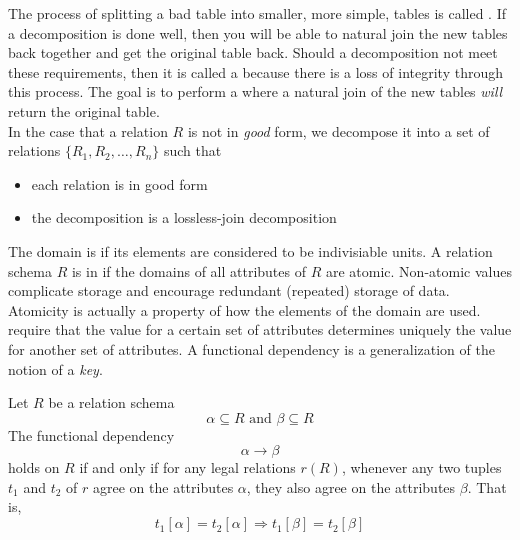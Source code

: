 \documentclass{article}
\begin{document}
The process of splitting a bad table into smaller, more simple, tables is called . If a decomposition is done well, then you will be able to natural join the new tables back together and get the original table back. Should a decomposition not meet these requirements, then it is called a  because there is a loss of integrity through this process. The goal is to perform a  where a natural join of the new tables \emph{will} return the original table. \\

In the case that a relation $R$ is not in \emph{good} form, we decompose it into a set of relations $\{R_1 , R_2 , \dots , R_n\}$ such that 
\begin{itemize}
  \item each relation is in good form 
  \item the decomposition is a lossless-join decomposition
\end{itemize}

The domain is  if its elements are considered to be indivisiable units. A relation schema $R$ is in  if the domains of all attributes of $R$ are atomic. Non-atomic values complicate storage and encourage redundant (repeated) storage of data. Atomicity is actually a property of how the elements of the domain are used. \\ 

 require that the value for a certain set of attributes determines uniquely the value for another set of attributes. A functional dependency is a generalization of the notion of a \emph{key}.\\ 

\begin{definition}
  Let $R$ be a relation schema $$\alpha \subseteq R \textrm{ and } \beta \subseteq R$$ The functional dependency $$\alpha \rightarrow \beta$$ holds on $R$ if and only if for any legal relations $r(R)$, whenever any two tuples $t_1$ and $t_2$ of $r$ agree on the attributes $\alpha$, they also agree on the attributes $\beta$. That is, $$t_1 [\alpha] = t_2 [\alpha] \Rightarrow t_1 [\beta] = t_2 [\beta]$$
\end{definition}
\end{document}
